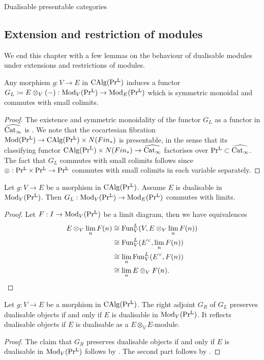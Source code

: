 \begin{subsection}{Dualisable presentable categories}
\subsection{Extension and restriction of modules}
We end this chapter with a few lemmas on the behaviour of dualisable modules under extensions and restrictions of modules. 
\begin{lemma}\label{tensor in Prl commutes with colimits}
 Any morphism $g: V \to E$ in $\operatorname{CAlg}(\operatorname{Pr^{L}})$ induces a functor $G_L\coloneq E \otimes_V (-): \operatorname{Mod}_V(\operatorname{Pr^{L}}) \to  \operatorname{Mod}_E(\operatorname{Pr^{L}})$ which is symmetric monoidal and commutes with small colimits.  
\end{lemma}
\begin{proof}
    The existence and symmetric monoidality of the functor $G_L$ as a functor in $\widehat{\operatorname{Cat_{\infty}}}$ is \Cite[Remark 4.5.3.2]{lurie2017higher}. We note that the cocartesian fibration $\operatorname{Mod}(\operatorname{Pr^{L}}) \to \operatorname{CAlg}(\operatorname{Pr^{L}}) \times  N(Fin_\ast)$ is presentable, in the sense that its classifying functor $\operatorname{CAlg}(\operatorname{Pr^{L}}) \times  N(Fin_\ast) \to \widehat{\operatorname{Cat_{\infty}}} $ factorises over $\operatorname{Pr^{L}} \subset \widehat{\operatorname{Cat_{\infty}}}$. The fact that $G_L$ commutes with small colimits follows since $ \otimes: \operatorname{Pr^{L}} \times \operatorname{Pr^{L}} \to \operatorname{Pr^{L}} $ commutes with small colimits in each variable separately.
\end{proof}

\begin{lemma}\label{tensor with dualisable object commmutes lim}
Let $g: V \to E$ be a morphism in $\operatorname{CAlg}(\operatorname{Pr^{L}})$. Assume $E$ is dualisable in $\operatorname{Mod}_V(\operatorname{Pr^{L}})$. Then $G_L : \operatorname{Mod}_V(\operatorname{Pr^{L}}) \to  \operatorname{Mod}_E(\operatorname{Pr^{L}})$ commutes with limits.
\end{lemma}
\begin{proof}
Let $F: I \to \operatorname{Mod}_V(\operatorname{Pr^{L}})$ be a limit diagram, then we have equivalences 
\begin{align*}
  E \otimes_V \lim_n F(n) &\cong \operatorname{Fun}^L_V(V, E \otimes_V \lim_n F(n)) \\
  &\cong \operatorname{Fun}^L_V(E^\vee, \lim_n F(n)) \\
  &\cong \lim_n\operatorname{Fun}^L_V(E^\vee, F(n)) \\
   & \cong \lim_n E \otimes_V F(n).  
\end{align*}
\end{proof}



\begin{lemma}\label{extensionrestriction}
Let $g: V \to E$ be a morphism in $\operatorname{CAlg}(\operatorname{Pr^{L}})$. The right adjoint $G_R$ of $G_L$ preserves dualisable objects if and only if $E$ is dualisable in $\operatorname{Mod}_V(\operatorname{Pr^{L}})$. It reflects dualisable objects if $E$ is dualisable as a $E\otimes_V E$-module.
\end{lemma}
\begin{proof}
The claim that $G_R$ preserves dualisable objects if and only if $E$ is dualisable in $\operatorname{Mod}_V(\operatorname{Pr^{L}})$ follows by \Cite[Proposition 4.6.4.4. (8)]{lurie2017higher}. The second part follows by \Cite[Proposition 4.6.4.12 (6)]{lurie2017higher}.
\end{proof}



\end{subsection}


